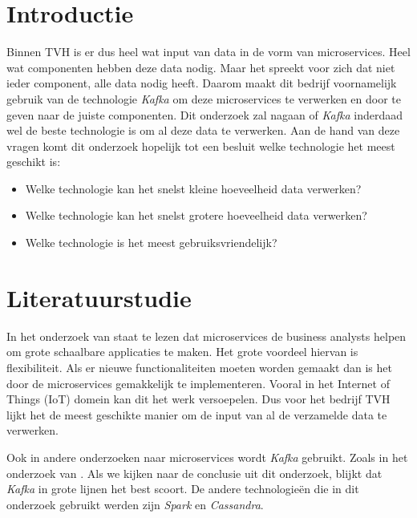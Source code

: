 
\section{Introductie} %
\label{sec:introductie}
Binnen TVH is er dus heel wat input van data in de vorm van microservices. Heel wat componenten hebben deze data nodig. Maar het spreekt voor zich dat niet ieder component, alle data nodig heeft. Daarom maakt dit bedrijf voornamelijk gebruik van de technologie \emph{Kafka} om deze microservices te verwerken en door te geven naar de juiste componenten. Dit onderzoek zal nagaan of \emph{Kafka} inderdaad wel de beste technologie is om al deze data te verwerken. Aan de hand van deze vragen komt dit onderzoek hopelijk tot een besluit welke technologie het meest geschikt is:
\begin{itemize}
\item Welke technologie kan het snelst kleine hoeveelheid data verwerken?
\item Welke technologie kan het snelst grotere hoeveelheid data verwerken?
\item Welke technologie is het meest gebruiksvriendelijk?
\end{itemize}



\section{Literatuurstudie}
\label{sec:Literatuurstudie}
In het onderzoek van \textcite{Shadija2017} staat te lezen dat microservices de business analysts helpen om grote schaalbare applicaties te maken. Het grote voordeel hiervan is flexibiliteit. Als er nieuwe functionaliteiten moeten worden gemaakt dan is het door de microservices gemakkelijk te implementeren. Vooral in het Internet of Things (IoT) domein kan dit het werk versoepelen. Dus voor het bedrijf TVH lijkt het de meest geschikte manier om de input van al de verzamelde data te verwerken.

Ook in andere onderzoeken naar microservices wordt \emph{Kafka} gebruikt. Zoals in het onderzoek van \textcite{Khazaei2017}. Als we kijken naar de conclusie uit dit onderzoek, blijkt dat \emph{Kafka} in grote lijnen het best scoort. De andere technologieën die in dit onderzoek gebruikt werden zijn \emph{Spark} en \emph{Cassandra}.

